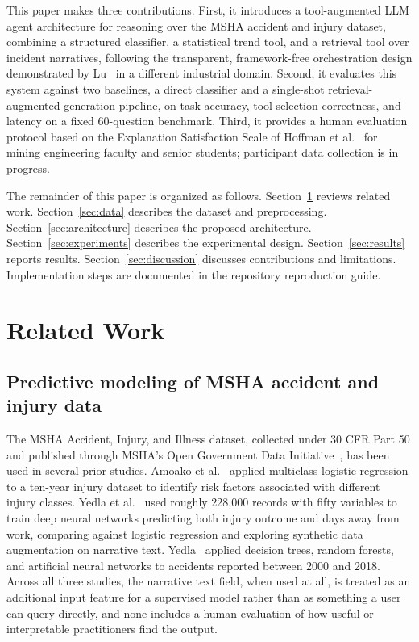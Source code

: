 \documentclass[11pt,a4paper]{article}
\begin{document}
This paper makes three contributions. First, it introduces a tool-augmented
LLM agent architecture for reasoning over the MSHA accident and injury
dataset, combining a structured classifier, a statistical trend tool, and
a retrieval tool over incident narratives, following the transparent,
framework-free orchestration design demonstrated by Lu~\cite{Lu2026} in a
different industrial domain. Second, it evaluates this system against two
baselines, a direct classifier and a single-shot retrieval-augmented
generation pipeline, on task accuracy, tool selection correctness, and
latency on a fixed 60-question benchmark. Third, it provides a human
evaluation protocol based on the Explanation Satisfaction Scale of Hoffman
et al.~\cite{Hoffman2023} for mining engineering faculty and senior
students; participant data collection is in progress.

The remainder of this paper is organized as follows. Section~\ref{sec:related}
reviews related work. Section~\ref{sec:data} describes the dataset and
preprocessing. Section~\ref{sec:architecture} describes the proposed
architecture. Section~\ref{sec:experiments} describes the experimental
design. Section~\ref{sec:results} reports results. Section~\ref{sec:discussion}
discusses contributions and limitations. Implementation steps are documented
in the repository reproduction guide.

\section{Related Work}
\label{sec:related}

\subsection{Predictive modeling of MSHA accident and injury data}

The MSHA Accident, Injury, and Illness dataset, collected under 30 CFR Part
50 and published through MSHA's Open Government Data Initiative~\cite{MSHA2024},
has been used in several prior studies. Amoako et al.~\cite{Amoako2021} applied
multiclass logistic regression to a ten-year injury dataset to identify risk
factors associated with different injury classes. Yedla et al.~\cite{Yedla2020}
used roughly 228{,}000 records with fifty variables to train deep neural
networks predicting both injury outcome and days away from work, comparing
against logistic regression and exploring synthetic data augmentation on
narrative text. Yedla~\cite{Yedla2019} applied decision trees, random forests,
and artificial neural networks to accidents reported between 2000 and 2018.
Across all three studies, the narrative text field, when used at all, is treated
as an additional input feature for a supervised model rather than as something
a user can query directly, and none includes a human evaluation of how useful
or interpretable practitioners find the output.
\end{document}
